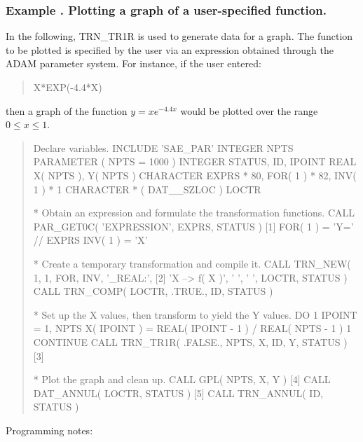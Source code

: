 \documentclass[twoside,nolof,11pt]{starlink}
\providecommand{\name}[1]{\small{#1}}
\newcounter{examplecounter}
\providecommand{\example}[1]{\addtocounter{examplecounter}{1}
                         \subsubsection*{Example \theexamplecounter. #1}}
\begin{document}
\example{Plotting a graph of a user-specified function.}
In the following, \name{TRN\_TR1R} is used to generate data for a graph.
The function to be plotted is specified by the user via an expression
obtained through the \name{ADAM} parameter system.
For instance, if the user entered:

\begin{quote}
\begin{terminalv}
X*EXP(-4.4*X)
\end{terminalv}
\end{quote}

then a graph of the function \mbox{$y=xe^{-4.4x}$} would be plotted over the
range \mbox{$0\le x\le 1$}.

\begin{quote}
\begin{terminalv}
  Declare variables.
      INCLUDE 'SAE_PAR'
      INTEGER NPTS
      PARAMETER ( NPTS = 1000 )
      INTEGER STATUS, ID, IPOINT
      REAL X( NPTS ), Y( NPTS )
      CHARACTER EXPRS * 80, FOR( 1 ) * 82, INV( 1 ) * 1
      CHARACTER * ( DAT__SZLOC ) LOCTR

*  Obtain an expression and formulate the transformation functions.
      CALL PAR_GET0C( 'EXPRESSION', EXPRS, STATUS )           [1]
      FOR( 1 ) = 'Y=' // EXPRS
      INV( 1 ) = 'X'

*  Create a temporary transformation and compile it.
      CALL TRN_NEW( 1, 1, FOR, INV, '_REAL:',                 [2]
                    'X --> f( X )', ' ', ' ', LOCTR, STATUS )
      CALL TRN_COMP( LOCTR, .TRUE., ID, STATUS )

*  Set up the X values, then transform to yield the Y values.
      DO 1 IPOINT = 1, NPTS
         X( IPOINT ) = REAL( IPOINT - 1 ) / REAL( NPTS - 1 )
    1 CONTINUE
      CALL TRN_TR1R( .FALSE., NPTS, X, ID, Y, STATUS )        [3]

*  Plot the graph and clean up.
      CALL GPL( NPTS, X, Y )                                  [4]
      CALL DAT_ANNUL( LOCTR, STATUS )                         [5]
      CALL TRN_ANNUL( ID, STATUS )

\end{terminalv}
\end{quote}

Programming notes:
\end{document}
